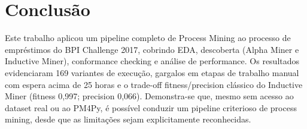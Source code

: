 \documentclass[12pt,a4paper]{article}
\begin{document}
\section{Conclusão}

Este trabalho aplicou um pipeline completo de Process Mining ao processo de empréstimos do BPI Challenge 2017, cobrindo EDA, descoberta (Alpha Miner e Inductive Miner), conformance checking e análise de performance. Os resultados evidenciaram 169 variantes de execução, gargalos em etapas de trabalho manual com espera acima de 25 horas e o trade-off fitness/precision clássico do Inductive Miner (fitness 0,997; precision 0,066). Demonstra-se que, mesmo sem acesso ao dataset real ou ao PM4Py, é possível conduzir um pipeline criterioso de process mining, desde que as limitações sejam explicitamente reconhecidas.
\end{document}
